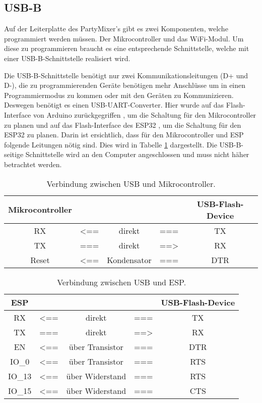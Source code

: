 \subsection{USB-B}
\label{subsec:USB-B}

Auf der Leiterplatte des PartyMixer's gibt es zwei Komponenten, welche programmiert werden müssen. Der Mikrocontroller und das WiFi-Modul. Um diese zu programmieren braucht es eine entsprechende Schnittstelle, welche mit einer USB-B-Schnittstelle realisiert wird.

Die USB-B-Schnittstelle benötigt nur zwei Kommunikationsleitungen (D+ und D-), die zu programmierenden Geräte benötigen mehr Anschlüsse um in einen Programmiermodus zu kommen oder mit den Geräten zu Kommunizieren. Deswegen benötigt es einen USB-UART-Converter. Hier wurde auf das Flash-Interface von Arduino zurückgegriffen \cite{arduino_cc_arduino_2017}, um die Schaltung für den Mikrocontroller zu planen und auf das Flash-Interface des ESP32 \cite{espressif_systems_esp32_2016}, um die Schaltung für den ESP32 zu planen. Darin ist ersichtlich, dass für den Mikrocontroller und ESP folgende Leitungen nötig sind. Dies wird in Tabelle \ref{tab:USB_uC} dargestellt. Die USB-B-seitige Schnittstelle wird an den Computer angeschlossen und muss nicht häher betrachtet werden.

\begin{table}[h!]
\center
\begin{tabular}{|c|lcl|c|}
\hline
\textbf{Mikrocontroller} & & & & \textbf{USB-Flash-Device} \\ \hline
RX & <== & direkt & === & TX  \\
TX & === & direkt & ==> & RX  \\
Reset & <== & Kondensator & === & DTR \\
\hline
\end{tabular}
\label{tab:USB_uC}
\caption{Verbindung zwischen USB und Mikrocontroller.}
\end{table}

\begin{table}[h!]
\center
\begin{tabular}{|c|lcl|c|}
\hline
\textbf{ESP} & & & & \textbf{USB-Flash-Device} \\ \hline
RX & <== & direkt & === & TX  \\
TX & === & direkt & ==> & RX  \\
EN & <== & über Transistor & === & DTR \\
IO\_0 & <== & über Transistor & === & RTS \\
IO\_13 & <== & über Widerstand & === & RTS \\
IO\_15 & <== & über Widerstand & === & CTS \\
\hline
\end{tabular}
\label{tab:USB_ESP}
\caption{Verbindung zwischen USB und ESP.}
\end{table}

